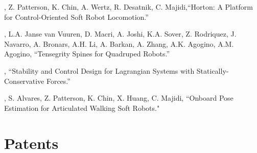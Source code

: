 \documentclass[letterpaper]{deedy-resume} %
\begin{document}
{\vspace{0.1cm}

\begin{etaremune}[itemsep=0.1cm]


  

\item \underline{{}}, Z. Patterson, K. Chin, A. Wertz, R. Desatnik, C. Majidi,``Horton: A Platform for Control-Oriented Soft Robot Locomotion.''

\item \underline{{}}, L.A. Janse van Vuuren, D. Macri, A. Joshi, K.A. Sover, Z. Rodriquez, J. Navarro, A. Bronars, A.H. Li, A. Barkan, A. Zhang, A.K. Agogino, A.M. Agogino, ``Tensegrity Spines for Quadruped Robots.''

\item \underline{{}}, ``Stability and Control Design for Lagrangian Systems with Statically-Conservative Forces.''


\item \underline{{}}, S. Alvares, Z. Patterson, K. Chin, X. Huang, C. Majidi, ``Onboard Pose Estimation for Articulated Walking Soft Robots."

\end{etaremune}


\section{Patents}

}
\end{document}
